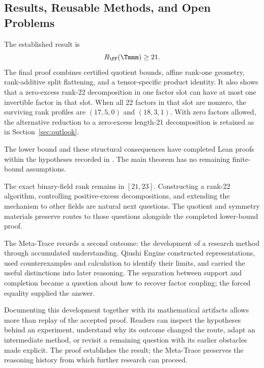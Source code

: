 \subsection{Results, Reusable Methods, and Open Problems}\label{route:outcome}

The established result is
\[
 R_{\FF}(\Tmmm)\ge21.
\]
The final proof combines certified quotient bounds, affine rank-one
geometry, rank-additive split flattening, and a tensor-specific product
identity. It also shows that a zero-excess rank-22 decomposition in
one factor slot can have at most one invertible factor in that slot.
When all 22 factors in that slot are nonzero, the surviving rank profiles
are $(17,5,0)$ and $(18,3,1)$. With zero factors allowed, the alternative
reduction to a zero-excess length-21 decomposition is retained as in
Section~\ref{sec:outlook}.

The lower bound and these structural consequences have completed Lean
proofs within the hypotheses recorded in .
The main theorem has no remaining finite-bound assumptions.

The exact binary-field rank remains in $[21,23]$. Constructing a
rank-22 algorithm, controlling positive-excess decompositions, and
extending the mechanism to other fields are natural next questions.
The quotient and symmetry materials preserve routes to those questions
alongside the completed lower-bound proof.

The Meta-Trace records a second outcome: the development of a research
method through accumulated understanding. Qiushi Engine constructed
representations, used counterexamples and calculation to identify their
limits, and carried the useful distinctions into later reasoning. The
separation between support and completion became a question about how
to recover factor coupling; the forced equality supplied the answer.

Documenting this development together with its mathematical artifacts
allows more than replay of the accepted proof. Readers can inspect
the hypotheses behind an experiment, understand why its outcome changed
the route, adapt an intermediate method, or revisit a remaining question
with its earlier obstacles made explicit. The proof establishes the
result; the Meta-Trace preserves the reasoning history from which
further research can proceed.
